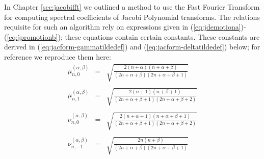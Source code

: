 In Chapter \ref{sec:jacobifft} we outlined a method to use the Fast Fourier
Transform for computing spectral coefficients of Jacobi Polynomial transforms.
The relations requisite for such an algorithm rely on expressions given in
(\ref{eq:jdemotiona})-(\ref{eq:jpromotionb}); these equations
contain certain constants. These constants are derived in 
(\ref{eq:jacform-gammatildedef}) and (\ref{eq:jacform-deltatildedef}) below;
for reference we reproduce them here:
\begin{eqnarray}
  \mu_{n, 0}^{(\alpha, \beta)} & = & \sqrt{\frac{2 (n + \alpha) (n + \alpha +
  \beta)}{(2 n + \alpha + \beta) (2 n + \alpha + \beta + 1)}} 
  \label{eq:mu0}\\
  &  &  \nonumber\\
  \mu_{n, 1}^{(\alpha, \beta)} & = & \sqrt{\frac{2 (n + 1) (n + \beta + 1)}{(2
  n + \alpha + \beta + 1) (2 n + \alpha + \beta + 2)}}  \label{eq:mu1}\\
  &  &  \nonumber\\
  \nu_{n, 0}^{(\alpha, \beta)} & = & \sqrt{\frac{2 (n + \alpha + 1) (n +
  \alpha + \beta + 1)}{(2 n + \alpha + \beta + 1) (2 n + \alpha + \beta + 2)}}
  \label{eq:nu0}\\
  &  &  \nonumber\\
  \nu_{n, - 1}^{(\alpha, \beta)} & = & \sqrt{\frac{2 n (n + \beta)}{(2 n +
  \alpha + \beta) (2 n + \alpha + \beta + 1)}}  \label{eq:nu1}
\end{eqnarray}



